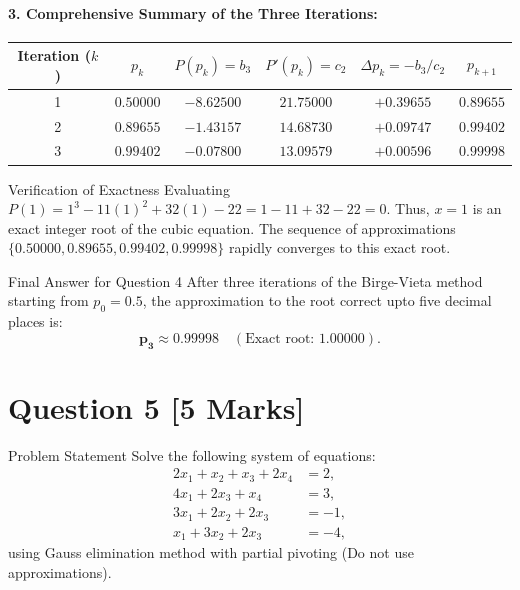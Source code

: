 \documentclass[11pt,a4paper]{article}
\begin{document}
\paragraph{3. Comprehensive Summary of the Three Iterations:}
\begin{center}
\begin{tabular}{cccccc}
\toprule
\textbf{Iteration ($k$)} & $p_k$ & $P(p_k) = b_3$ & $P'(p_k) = c_2$ & $\Delta p_k = -b_3/c_2$ & $p_{k+1}$ \\
\midrule
1 & $0.50000$ & $-8.62500$ & $21.75000$ & $+0.39655$ & $0.89655$ \\
2 & $0.89655$ & $-1.43157$ & $14.68730$ & $+0.09747$ & $0.99402$ \\
3 & $0.99402$ & $-0.07800$ & $13.09579$ & $+0.00596$ & $\mathbf{0.99998}$ \\
\bottomrule
\end{tabular}
\end{center}

\begin{notebox}{Verification of Exactness}
Evaluating $P(1) = 1^3 - 11(1)^2 + 32(1) - 22 = 1 - 11 + 32 - 22 = 0$. Thus, $x = 1$ is an exact integer root of the cubic equation. The sequence of approximations $\{0.50000, 0.89655, 0.99402, 0.99998\}$ rapidly converges to this exact root.
\end{notebox}

\begin{answerbox}{Final Answer for Question 4}
After three iterations of the Birge-Vieta method starting from $p_0 = 0.5$, the approximation to the root correct upto five decimal places is:
\[
\mathbf{p_3 \approx 0.99998} \quad (\text{Exact root: } 1.00000).
\]
\end{answerbox}

\vspace{0.8cm}

\section*{Question 5 \hfill \normalsize [5 Marks]}

\begin{questionbox}{Problem Statement}
Solve the following system of equations:
\begin{align*}
2x_1 + x_2 + x_3 + 2x_4 &= 2, \\
4x_1 + 2x_3 + x_4 &= 3, \\
3x_1 + 2x_2 + 2x_3 &= -1, \\
x_1 + 3x_2 + 2x_3 &= -4,
\end{align*}
using Gauss elimination method with partial pivoting (Do not use approximations).
\end{questionbox}
\end{document}
